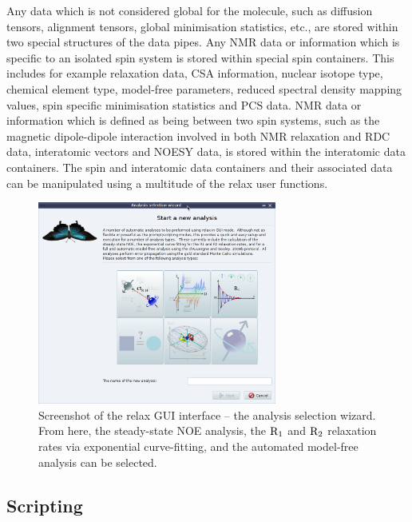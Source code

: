 Any data which is not considered global for the molecule, such as diffusion tensors, alignment tensors, global minimisation statistics, etc., are stored within two special structures of the data pipes.  Any NMR data or information which is specific to an isolated spin system is stored within special spin containers.  This includes for example relaxation data, CSA information, nuclear isotope type, chemical element type, model-free parameters, reduced spectral density mapping values, spin specific minimisation statistics and PCS data.  NMR data or information which is defined as being between two spin systems, such as the magnetic dipole-dipole interaction involved in both NMR relaxation and RDC data, interatomic vectors and NOESY data, is stored within the interatomic data containers.  The spin and interatomic data containers and their associated data can be manipulated using a multitude of the relax user functions.


\begin{figure}
\centerline{\includegraphics[width=0.7\textwidth, bb=14 14 657 560]{graphics/screenshots/analysis_wizard}}
\caption[GUI screenshot -- Analysis wizard screenshot]{Screenshot of the relax GUI interface -- the analysis selection wizard.  From here, the steady-state NOE analysis, the $\mathrm{R}_1$ and $\mathrm{R}_2$ relaxation rates via exponential curve-fitting, and the automated model-free analysis can be selected.}\label{fig: screenshot: analysis wizard}
\end{figure}




\subsection{Scripting} \label{sect: scripting}

